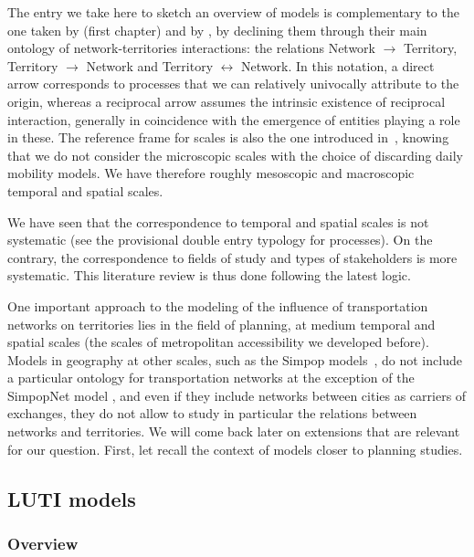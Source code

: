 \documentclass[10pt]{article}
\begin{document}
The entry we take here to sketch an overview of models is complementary to the one taken by \cite{raimbault2018caracterisation} (first chapter) and by \cite{raimbault2020systematic}, by declining them through their main ontology of network-territories interactions: the relations Network $\rightarrow$ Territory, Territory $\rightarrow$ Network and Territory $\leftrightarrow$ Network. In this notation, a direct arrow corresponds to processes that we can relatively univocally attribute to the origin, whereas a reciprocal arrow assumes the intrinsic existence of reciprocal interaction, generally in coincidence with the emergence of entities playing a role in these. The reference frame for scales is also the one introduced in~\cite{raimbault2018caracterisation}, knowing that we do not consider the microscopic scales with the choice of discarding daily mobility models. We have therefore roughly mesoscopic and macroscopic temporal and spatial scales.

We have seen that the correspondence to temporal and spatial scales is not systematic (see the provisional double entry typology for processes). On the contrary, the correspondence to fields of study and types of stakeholders is more systematic. This literature review is thus done following the latest logic.

One important approach to the modeling of the influence of transportation networks on territories lies in the field of planning, at medium temporal and spatial scales (the scales of metropolitan accessibility we developed before). Models in geography at other scales, such as the Simpop models~\cite{pumain2012multi}, do not include a particular ontology for transportation networks at the exception of the SimpopNet model \cite{schmitt2014modelisation}, and even if they include networks between cities as carriers of exchanges, they do not allow to study in particular the relations between networks and territories. We will come back later on extensions that are relevant for our question. First, let recall the context of models closer to planning studies.


\subsection{LUTI models}

\subsubsection{Overview}
\end{document}

